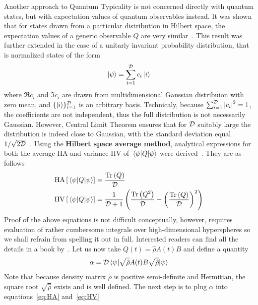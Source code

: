 Another approach to Quantum Typicality is not concerned directly with quantum states, but with 
expectation values of quantum observables instead.
It was shown that for states drawn from a particular distribution in Hilbert space, the expectation
values of a generic observable \(Q\) are very similar~\autocite{Reimann2007}. This result was further extended
in the case of a unitarly invariant probability distribution, that is normalized states of the form
\begin{equation}
	\ket{\psi} = \sum_{i = 1}^{\mathcal{D}} c_i \ket{i}
\end{equation} 
where \(\Re c_i\) and \(\Im c_i\) are drawn from multidimensional Gaussian distribuion with zero mean,
and \(\{\ket{i}\}_{i=1}^{\mathcal{D}}\) is an arbitrary basis. Technicaly, because \(\sum_{i=1}^{\mathcal{D}}\abs{c_i}^2 = 1\),
the coefficients are not independent, thus the full distribution is not necessarily Gaussian. However,
Central Limit Theorem ensures that for \(\mathcal{D}\) suitably large the distribution is indeed close to Gaussian,
with the standard deviation equal \(1/\sqrt{2\mathcal{D}}\)~\autocite{Gemmer2009}.
Using the \textbf{Hilbert space average method}, analytical expressions
for both the average \(\mathrm{HA}\) and variance \(\mathrm{HV}\) of \(\matrixel{\psi}{Q}{\psi}\)
were derived~\autocite{Bartsch2009a}. They are as follows
\begin{align}
	\mathrm{HA}\left[\matrixel{\psi}{Q}{\psi}\right] &= \frac{\Tr\left(Q\right)}{\dimension} \label{eq:HA} \\
	\mathrm{HV}\left[\matrixel{\psi}{Q}{\psi}\right] &= \frac{1}{\dimension + 1}\left(
		\frac{\Tr\left(Q^2\right)}{\dimension} - \left(\frac{\Tr\left(Q\right)}{\dimension}\right)^2
	\right)\label{eq:HV}
\end{align}
Proof of the above equations is not difficult conceptually, however, requires evaluation of rather
cumbersome integrals over high-dimensional hyperspheres so we shall refrain from spelling it out in full.
Interested readers can find all the details in a book by~\textcite{Gemmer2009}.
Let us now take \(Q(t) = \hat{\rho}A(t)B\)
and define a quantity
\begin{equation}
	\alpha = \dimension \matrixel{\psi}{\sqrt{\hat{\rho}}A(t)B\sqrt{\hat{\rho}}}{\psi}
\end{equation}
Note that because density matrix \(\hat{\rho}\) is positive semi-definite and Hermitian, the
square root \(\sqrt{\hat{\rho}}\) exists and is well defined. The next step is to plug \(\alpha\)
into equations~\eqref{eq:HA} and~\eqref{eq:HV}
